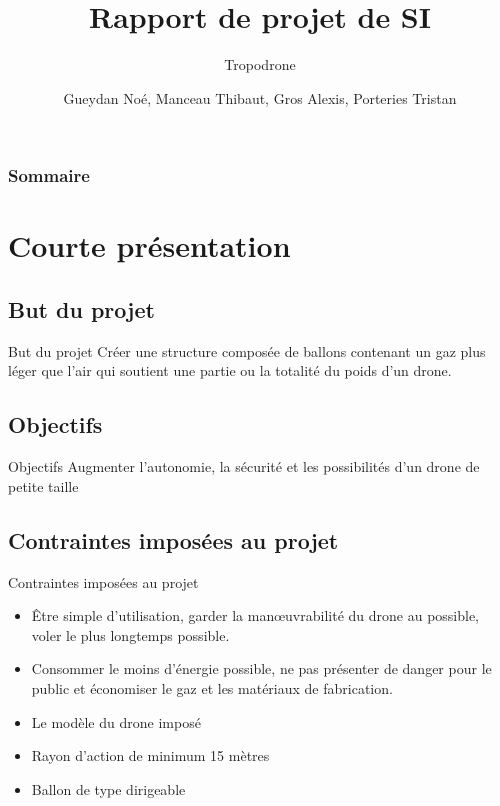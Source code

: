 \documentclass{beamer}
\title{Rapport de projet de SI}
\subtitle{Tropodrone}
\author{Gueydan Noé, Manceau Thibaut, Gros Alexis, Porteries Tristan}
\begin{document}
\begin{frame}
  \titlepage
\end{frame}

\begin{frame}
    \frametitle{Sommaire}
    \begin{multicols}{2}
      {
		\setcounter{tocdepth}{1}
        \tableofcontents
      }
    \end{multicols}
\end{frame}

\section{Courte présentation}

\subsection{But du projet}
\begin{frame}{But du projet}
 Créer une structure composée de ballons contenant un gaz plus léger que l’air qui soutient une partie ou la totalité du poids d'un drone.
\end{frame}


\subsection{Objectifs}
\begin{frame}{Objectifs}
 Augmenter l’autonomie, la sécurité et les possibilités d’un drone de petite taille
\end{frame}


\subsection{Contraintes imposées au projet}
\begin{frame}{Contraintes imposées au projet}
  \begin{itemize}
    \item Être simple d’utilisation, garder la manœuvrabilité du drone au possible, voler le plus longtemps possible.
    \item Consommer le moins d’énergie possible, ne pas présenter de danger pour le public et économiser le gaz et les matériaux de fabrication.
    \item Le modèle du drone imposé
    \item Rayon d’action de minimum 15 mètres
    \item Ballon de type dirigeable
  \end{itemize}
\end{frame}
\end{document}
